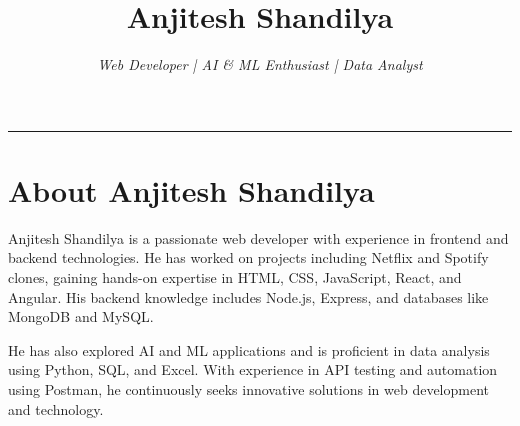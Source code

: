 \documentclass{article}
\title{\Huge \bfseries Anjitesh Shandilya}
\author{\Large \textit{Web Developer | AI & ML Enthusiast | Data Analyst}}
\date{}
\begin{document}
\maketitle
\begin{center}
    \rule{\textwidth}{0.5pt} %
\end{center}

\section{About Anjitesh Shandilya}
\noindent
Anjitesh Shandilya is a passionate web developer with experience in frontend and backend technologies. 
He has worked on projects including Netflix and Spotify clones, gaining hands-on expertise in HTML, CSS, JavaScript, React, and Angular. 
His backend knowledge includes Node.js, Express, and databases like MongoDB and MySQL.

He has also explored AI and ML applications and is proficient in data analysis using Python, SQL, and Excel. 
With experience in API testing and automation using Postman, he continuously seeks innovative solutions in web development and technology.
\end{document}
